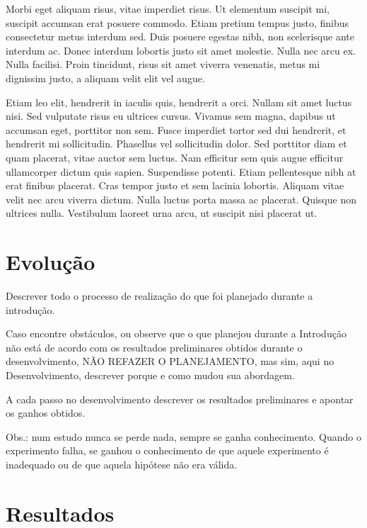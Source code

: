 Morbi eget aliquam risus, vitae imperdiet risus. Ut elementum suscipit mi, suscipit accumsan erat posuere commodo. Etiam pretium tempus justo, finibus consectetur metus interdum sed. Duis posuere egestas nibh, non scelerisque ante interdum ac. Donec interdum lobortis justo sit amet molestie. Nulla nec arcu ex. Nulla facilisi. Proin tincidunt, risus sit amet viverra venenatis, metus mi dignissim justo, a aliquam velit elit vel augue.

Etiam leo elit, hendrerit in iaculis quis, hendrerit a orci. Nullam sit amet luctus nisi. Sed vulputate risus eu ultrices cursus. Vivamus sem magna, dapibus ut accumsan eget, porttitor non sem. Fusce imperdiet tortor sed dui hendrerit, et hendrerit mi sollicitudin. Phasellus vel sollicitudin dolor. Sed porttitor diam et quam placerat, vitae auctor sem luctus. Nam efficitur sem quis augue efficitur ullamcorper dictum quis sapien. Suspendisse potenti. Etiam pellentesque nibh at erat finibus placerat. Cras tempor justo et sem lacinia lobortis. Aliquam vitae velit nec arcu viverra dictum. Nulla luctus porta massa ac placerat. Quisque non ultrices nulla. Vestibulum laoreet urna arcu, ut suscipit nisi placerat ut.

\section{Evolução}\label{US9999:evolucao}

\begin{displayquote}
    Descrever todo o processo de realização do que foi planejado durante a introdução.

    Caso encontre obstáculos, ou observe que o que planejou durante a Introdução não está de acordo com os resultados preliminares obtidos durante o desenvolvimento, NÃO REFAZER O PLANEJAMENTO, mas sim, aqui no Desenvolvimento, descrever porque e como mudou sua abordagem.

    A cada passo no desenvolvimento descrever os resultados preliminares e apontar os ganhos obtidos.

    Obs.: num estudo nunca se perde nada, sempre se ganha conhecimento. Quando o experimento falha, se ganhou o conhecimento de que aquele experimento é inadequado ou de que aquela hipótese não era válida.
\end{displayquote}

\section{Resultados}\label{US9999:resultados}

